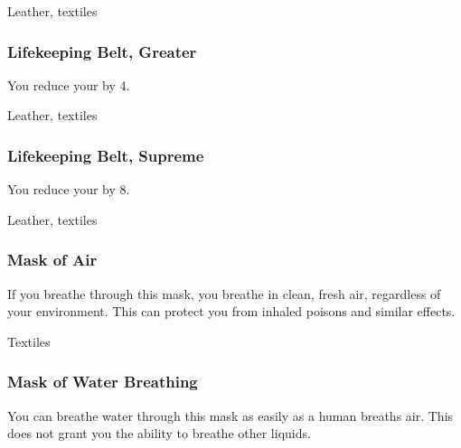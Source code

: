  


 Leather, textiles


\lowercase{\hypertarget{item:Lifekeeping Belt, Greater}{}}\label{item:Lifekeeping Belt, Greater}
\hypertarget{item:Lifekeeping Belt, Greater}{\subsubsection{Lifekeeping Belt, Greater\hfill{}}}

You reduce your  by 4.



 


 Leather, textiles


\lowercase{\hypertarget{item:Lifekeeping Belt, Supreme}{}}\label{item:Lifekeeping Belt, Supreme}
\hypertarget{item:Lifekeeping Belt, Supreme}{\subsubsection{Lifekeeping Belt, Supreme\hfill{}}}

You reduce your  by 8.



 


 Leather, textiles


\lowercase{\hypertarget{item:Mask of Air}{}}\label{item:Mask of Air}
\hypertarget{item:Mask of Air}{\subsubsection{Mask of Air\hfill{}}}

If you breathe through this mask, you breathe in clean, fresh air, regardless of your environment.
This can protect you from inhaled poisons and similar effects.



 Textiles


\lowercase{\hypertarget{item:Mask of Water Breathing}{}}\label{item:Mask of Water Breathing}
\hypertarget{item:Mask of Water Breathing}{\subsubsection{Mask of Water Breathing\hfill{}}}

You can breathe water through this mask as easily as a human breaths air.
This does not grant you the ability to breathe other liquids.



